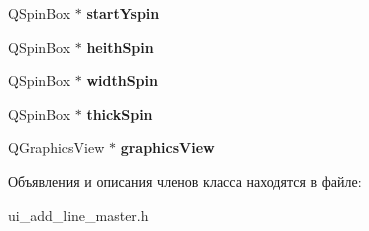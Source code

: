 \begin{DoxyCompactItemize}
\item 
\hypertarget{class_ui___dialog_a108781ef52a950ce285441166bfd3eee}{\-Q\-Spin\-Box $\ast$ {\bfseries start\-Yspin}}\label{class_ui___dialog_a108781ef52a950ce285441166bfd3eee}

\item 
\hypertarget{class_ui___dialog_af1ef38c02e0bc59838d06cbce6a4b5b2}{\-Q\-Spin\-Box $\ast$ {\bfseries heith\-Spin}}\label{class_ui___dialog_af1ef38c02e0bc59838d06cbce6a4b5b2}

\item 
\hypertarget{class_ui___dialog_a87dc72e4aa6e0c2fdd7680157751771a}{\-Q\-Spin\-Box $\ast$ {\bfseries width\-Spin}}\label{class_ui___dialog_a87dc72e4aa6e0c2fdd7680157751771a}

\item 
\hypertarget{class_ui___dialog_aed5c39f3e503e2d3e743d89c6aa60738}{\-Q\-Spin\-Box $\ast$ {\bfseries thick\-Spin}}\label{class_ui___dialog_aed5c39f3e503e2d3e743d89c6aa60738}

\item 
\hypertarget{class_ui___dialog_a95e25d36a940c3e3e4a684c7dea1dece}{\-Q\-Graphics\-View $\ast$ {\bfseries graphics\-View}}\label{class_ui___dialog_a95e25d36a940c3e3e4a684c7dea1dece}

\end{DoxyCompactItemize}


Объявления и описания членов класса находятся в файле\-:\begin{DoxyCompactItemize}
\item 
ui\-\_\-add\-\_\-line\-\_\-master.\-h\end{DoxyCompactItemize}
